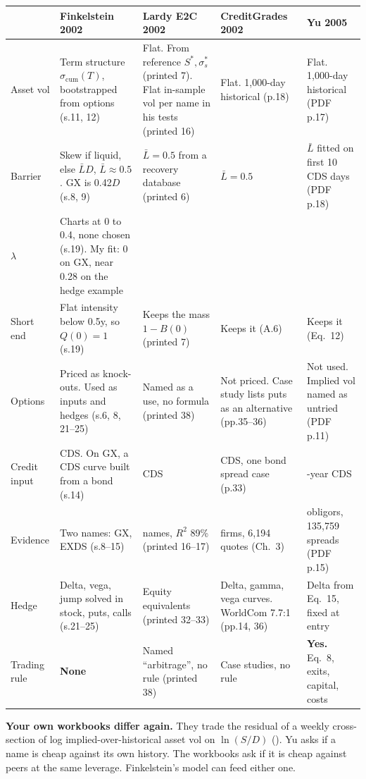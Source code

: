 \documentclass[10pt,a4paper]{article}
\newcommand{\Lbar}{\bar{L}}
\newcommand{\scum}{\sigma_{\mathrm{cum}}}
\begin{document}
\begin{center}
\footnotesize
\begin{tabularx}{\textwidth}{@{}>{\raggedright\arraybackslash}p{2.0cm}>{\raggedright\arraybackslash}X>{\raggedright\arraybackslash}X>{\raggedright\arraybackslash}X>{\raggedright\arraybackslash}X@{}}
\toprule
 & \textbf{Finkelstein 2002} & \textbf{Lardy E2C 2002} & \textbf{CreditGrades 2002} & \textbf{Yu 2005} \\
\midrule
Asset vol & Term structure $\scum(T)$, bootstrapped from options (s.11, 12) & Flat. From reference $S^*,\sigma_s^*$ (printed 7). Flat in-sample vol per name in his tests (printed 16) & Flat. 1,000-day historical (p.18) & Flat. 1,000-day historical (PDF p.17) \\
Barrier & Skew if liquid, else $\Lbar D$, $\Lbar\approx0.5$. GX is 0.42$D$ (s.8, 9) & $\Lbar=0.5$ from a recovery database (printed 6) & $\Lbar=0.5$ & $\Lbar$ fitted on first 10 CDS days (PDF p.18) \\
$\lambda$ & Charts at 0 to 0.4, none chosen (s.19). My fit: 0 on GX, near 0.28 on the hedge example & 0.3 & 0.3 & 0.3 \\
Short end & Flat intensity below 0.5y, so $Q(0)=1$ (s.19) & Keeps the mass $1-B(0)$ (printed 7) & Keeps it (A.6) & Keeps it (Eq.\ 12) \\
Options & Priced as knock-outs. Used as inputs and hedges (s.6, 8, 21--25) & Named as a use, no formula (printed 38) & Not priced. Case study lists puts as an alternative (pp.35--36) & Not used. Implied vol named as untried (PDF p.11) \\
Credit input & CDS. On GX, a CDS curve built from a bond (s.14) & CDS & CDS, one bond spread case (p.33) & 5-year CDS \\
Evidence & Two names: GX, EXDS (s.8--15) & 142 names, $R^2$ 89\% (printed 16--17) & 122 firms, 6,194 quotes (Ch.\ 3) & 261 obligors, 135,759 spreads (PDF p.15) \\
Hedge & Delta, vega, jump solved in stock, puts, calls (s.21--25) & Equity equivalents (printed 32--33) & Delta, gamma, vega curves. WorldCom 7.7:1 (pp.14, 36) & Delta from Eq.\ 15, fixed at entry \\
Trading rule & \textbf{None} & Named ``arbitrage'', no rule (printed 38) & Case studies, no rule & \textbf{Yes.} Eq.\ 8, exits, capital, costs \\
\bottomrule
\end{tabularx}
\end{center}

\textbf{Your own workbooks differ again.} They trade the residual of a weekly cross-section of log implied-over-historical asset vol on $\ln(S/D)$ (). Yu asks if a name is cheap against its own history. The workbooks ask if it is cheap against peers at the same leverage. Finkelstein's model can feed either one.
\end{document}
